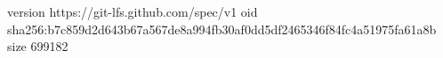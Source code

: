 version https://git-lfs.github.com/spec/v1
oid sha256:b7c859d2d643b67a567de8a994fb30af0dd5df2465346f84fc4a51975fa61a8b
size 699182
